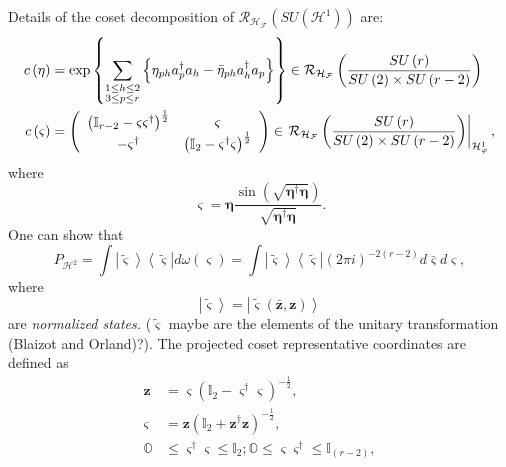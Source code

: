 \documentclass[aps,preprint]{revtex4}%
\begin{document}
Details of the coset decomposition of $\mathcal{R}_{\mathcal{H}_{\mathcal{F}}%
}\left(  SU\left(  \mathcal{H}^{1}\right)  \right)  $ are:
\begin{align}
c\left(  \mathbf{\eta}\right)   &  =\exp\left\{  \sum\limits_{\substack{1\leq
h\leq2\\3\leq p\leq r}}\left\{  \eta_{ph}a_{p}^{\dagger}a_{h}-\bar{\eta}%
_{ph}a_{h}^{\dagger}a_{p}\right\}  \right\}  \in\mathcal{R}_{\mathcal{H}%
_{\mathcal{F}}}\left(  \frac{SU\left(  r\right)  }{SU\left(  2\right)  \times
SU\left(  r-2\right)  }\right) \\
c\left(  \mathbf{\varsigma}\right)   &  =\left(
\begin{array}
[c]{cc}%
\left(  \mathbb{I}_{r-2}-\mathbf{\varsigma\varsigma}^{\dagger}\right)
^{\frac{1}{2}} & \mathbf{\varsigma}\\
-\mathbf{\varsigma}^{\dagger} & \left(  \mathbb{I}_{2}-\mathbf{\varsigma
}^{\dagger}\mathbf{\varsigma}\right)  ^{\frac{1}{2}}%
\end{array}
\right)  \in\left.  \mathcal{R}_{\mathcal{H}_{\mathcal{F}}}\left(
\frac{SU\left(  r\right)  }{SU\left(  2\right)  \times SU\left(  r-2\right)
}\right)  \right\vert _{\mathcal{H}_{\mathbf{\varphi}}^{1}},
\end{align}
where%
\begin{equation}
\mathbf{\varsigma}=\mathbf{\eta}\frac{\sin\left(  \sqrt{\mathbf{\eta}%
^{\dagger}\mathbf{\eta}}\right)  }{\sqrt{\mathbf{\eta}^{\dagger}\mathbf{\eta}%
}}.
\end{equation}
One can show that
\begin{equation}
P_{\mathcal{H}^{2}}=\int\left\vert \mathbf{\tilde{\varsigma}}\right\rangle
\left\langle \mathbf{\tilde{\varsigma}}\right\vert d\omega\left(
\mathbf{\varsigma}\right)  =\int\left\vert \mathbf{\tilde{\varsigma}%
}\right\rangle \left\langle \mathbf{\tilde{\varsigma}}\right\vert \left(  2\pi
i\right)  ^{-2\left(  r-2\right)  }d\mathbf{\bar{\varsigma}}d\mathbf{\varsigma
},
\end{equation}
where
\begin{equation}
\left\vert \mathbf{\tilde{\varsigma}}\right\rangle =\left\vert \mathbf{\tilde
{\varsigma}}\left(  \mathbf{\bar{z},z}\right)  \right\rangle
\end{equation}
are \emph{normalized states. }($\mathbf{\tilde{\varsigma}}$ maybe are the
elements of the unitary transformation (Blaizot and Orland)?). The projected
coset representative coordinates are defined as
\begin{align}
\mathbf{z}  &  =\mathbf{\varsigma}\left(  \mathbb{I}_{2}-\mathbf{\varsigma
}^{\dagger}\mathbf{\varsigma}\right)  ^{-\frac{1}{2}},\nonumber\\
\mathbf{\varsigma}  &  =\mathbf{z}\left(  \mathbb{I}_{2}+\mathbf{z}^{\dagger
}\mathbf{z}\right)  ^{-\frac{1}{2}},\nonumber\\
\mathbb{O}  &  \leq\mathbf{\varsigma}^{\dagger}\mathbf{\varsigma}%
\leq\mathbb{I}_{2};\mathbb{O}\leq\mathbf{\varsigma\mathbf{\varsigma}^{\dagger
}}\leq\mathbb{I}_{\left(  r-2\right)  },
\end{align}
\end{document}
